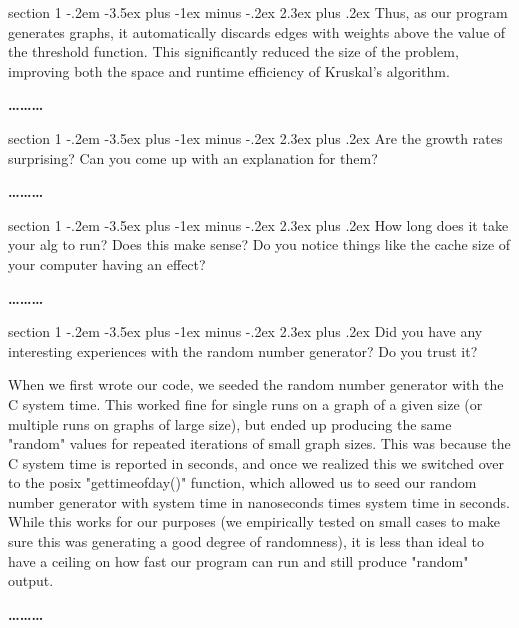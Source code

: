 \documentclass[12pt]{article}
\makeatletter
\newenvironment{problem}{\@startsection
       {section}
       {1}
       {-.2em}
       {-3.5ex plus -1ex minus -.2ex}
       {2.3ex plus .2ex}
       {\pagebreak[3]%
       \large\bf\noindent{Problem }
       }
       }
       {%
       \begin{center}\large\bf \ldots\ldots\ldots\end{center}}
\makeatother
\begin{document}
\begin{problem}{}
Thus, as our program generates graphs, it automatically discards edges with weights above the value of the threshold function.  This significantly reduced the size of the problem, improving both the space and runtime efficiency of Kruskal's algorithm.

\end{problem}

\begin{problem}{}
Are the growth rates surprising? Can you come up with an explanation
for them?

\end{problem}

\begin{problem}{}
How long does it take your alg to run? Does this make sense? Do you
notice things like the cache size of your computer having an effect?

\end{problem}

\begin{problem}{}
Did you have any interesting experiences with the random number
generator? Do you trust it?

When we first wrote our code, we seeded the random number generator with the C system time.  This worked fine for single runs on a graph of a given size (or multiple runs on graphs of large size), but ended up producing the same "random" values for repeated iterations of small graph sizes.  This was because the C system time is reported in seconds, and once we realized this we switched over to the posix "gettimeofday()" function, which allowed us to seed our random number generator with system time in nanoseconds times system time in seconds.  While this works for our purposes (we empirically tested on small cases to make sure this was generating a good degree of randomness), it is less than ideal to have a ceiling on how fast our program can run and still produce "random" output.  

\end{problem}

\end{document}
